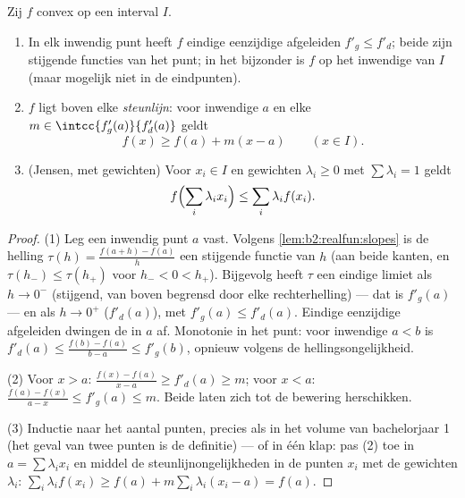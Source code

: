 \begin{theorem}\label{thm:b2:realfun:convexreg}
Zij $f$ convex op een interval $I$.
\begin{enumerate}
  \item In elk inwendig punt heeft $f$ eindige eenzijdige
        afgeleiden $f'_g \leq f'_d$; beide zijn stijgende functies
        van het punt; in het bijzonder is $f$  op het
        inwendige van $I$ (maar mogelijk niet in de eindpunten).
  \item $f$ ligt boven elke \emph{steunlijn}: voor inwendige $a$ en
        elke $m \in \intcc{f'_g(a)}{f'_d(a)}$ geldt
        \[
        f(x) \geq f(a) + m(x - a) \qquad (x \in I).
        \]
  \item (Jensen, met gewichten) Voor $x_i \in I$ en gewichten
        $\lambda_i \geq 0$ met $\sum\lambda_i = 1$ geldt
        \[
        f\Bigl(\sum_i \lambda_i x_i\Bigr) \leq \sum_i \lambda_i
        f(x_i) .\index{ongelijkheid van Jensen}
        \]
\end{enumerate}
\end{theorem}

\begin{proof}
(1) Leg een inwendig punt $a$ vast. Volgens
\cref{lem:b2:realfun:slopes} is de helling $\tau(h) = \frac{f(a +
h) - f(a)}{h}$ een stijgende functie van $h$ (aan beide kanten, en
$\tau(h_-) \leq \tau(h_+)$ voor $h_- < 0 < h_+$). Bijgevolg heeft
$\tau$ een eindige limiet als $h \to 0^-$ (stijgend, van boven
begrensd door elke rechterhelling) --- dat is $f'_g(a)$ --- en als
$h \to 0^+$ ($f'_d(a)$), met $f'_g(a) \leq f'_d(a)$. Eindige
eenzijdige afgeleiden dwingen de  in $a$ af. Monotonie
in het punt: voor inwendige $a < b$ is $f'_d(a) \leq \frac{f(b) -
f(a)}{b - a} \leq f'_g(b)$, opnieuw volgens de
hellingsongelijkheid.

(2) Voor $x > a$: $\frac{f(x) - f(a)}{x - a} \geq f'_d(a) \geq m$;
voor $x < a$: $\frac{f(a) - f(x)}{a - x} \leq f'_g(a) \leq m$.
Beide laten zich tot de bewering herschikken.

(3) Inductie naar het aantal punten, precies als in het volume van
bachelorjaar 1 (het geval van twee punten is de definitie) --- of
in één klap: pas (2) toe in $a = \sum\lambda_i x_i$ en middel de
steunlijnongelijkheden in de punten $x_i$ met de gewichten
$\lambda_i$: $\sum_i \lambda_i f(x_i) \geq f(a) +
m\sum_i\lambda_i(x_i - a) = f(a)$.
\end{proof}

